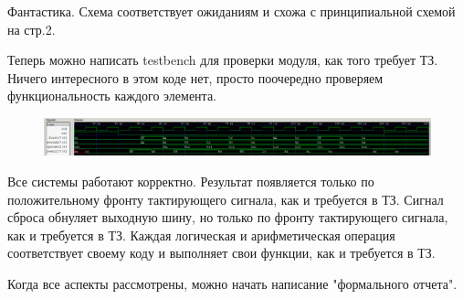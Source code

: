 \documentclass[a4paper,12pt]{article} %
\begin{document}
Фантастика. Схема соответствует ожиданиям и схожа с принципиальной схемой на стр.2.

Теперь можно написать testbench для проверки модуля, как того требует ТЗ. Ничего интересного в этом коде нет, просто поочередно проверяем функциональность каждого элемента.

\begin{figure}[H]
    \centering
    \includegraphics[width=1\linewidth]{Final/tb.png}
\end{figure}

Все системы работают корректно. Результат появляется только по положительному фронту тактирующего сигнала, как и требуется в ТЗ. Сигнал сброса обнуляет выходную шину, но только по фронту тактирующего сигнала, как и требуется в ТЗ. Каждая логическая и арифметическая операция соответствует своему коду и выполняет свои функции, как и требуется в ТЗ. 

Когда все аспекты рассмотрены, можно начать написание "формального отчета".
\end{document}

